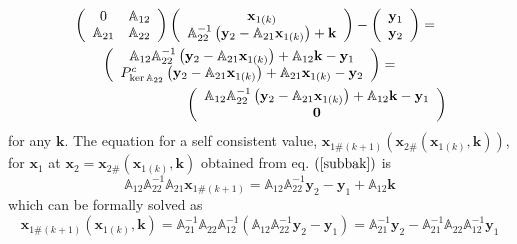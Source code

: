 \documentclass[aps,preprint]{revtex4}%
\begin{document}
\begin{align}
&  \left(
\begin{array}
[c]{cc}%
0 & \mathbb{A}_{12}\\
\mathbb{A}_{21} & \mathbb{A}_{22}%
\end{array}
\right)  \left(
\begin{array}
[c]{c}%
\mathbf{x}_{1\left(  k\right)  }\\
\mathbb{A}_{22}^{-1}\left(  \mathbf{y}_{2}-\mathbb{A}_{21}\mathbf{x}_{1\left(
k\right)  }\right)  +\mathbf{k}%
\end{array}
\right)  -\left(
\begin{array}
[c]{c}%
\mathbf{y}_{1}\\
\mathbf{y}_{2}%
\end{array}
\right)  =\nonumber\\
&  \qquad\left(
\begin{array}
[c]{c}%
\mathbb{A}_{12}\mathbb{A}_{22}^{-1}\left(  \mathbf{y}_{2}-\mathbb{A}%
_{21}\mathbf{x}_{1\left(  k\right)  }\right)  +\mathbb{A}_{12}\mathbf{k}%
-\mathbf{y}_{1}\\
P_{\ker\mathbb{A}_{22}}^{c}\left(  \mathbf{y}_{2}-\mathbb{A}_{21}%
\mathbf{x}_{1\left(  k\right)  }\right)  +\mathbb{A}_{21}\mathbf{x}_{1\left(
k\right)  }-\mathbf{y}_{2}%
\end{array}
\right)  =\nonumber\\
&  \qquad\qquad\qquad\qquad\left(
\begin{array}
[c]{c}%
\mathbb{A}_{12}\mathbb{A}_{22}^{-1}\left(  \mathbf{y}_{2}-\mathbb{A}%
_{21}\mathbf{x}_{1\left(  k\right)  }\right)  +\mathbb{A}_{12}\mathbf{k}%
-\mathbf{y}_{1}\\
\mathbf{0}%
\end{array}
\right)  \label{subbak}%
\end{align}
for any $\mathbf{k}$. The equation for a self consistent value, $\mathbf{x}%
_{1\#\left(  k+1\right)  }\left(  \mathbf{x}_{2\#}\left(  \mathbf{x}_{1\left(
k\right)  },\mathbf{k}\right)  \right)  $, for $\mathbf{x}_{1}$ at
$\mathbf{x}_{2}=\mathbf{x}_{2\#}\left(  \mathbf{x}_{1\left(  k\right)
},\mathbf{k}\right)  $ obtained from eq. $\left(  \ref{subbak}\right)  $ is%
\begin{equation}
\mathbb{A}_{12}\mathbb{A}_{22}^{-1}\mathbb{A}_{21}\mathbf{x}_{1\#\left(
k+1\right)  }=\mathbb{A}_{12}\mathbb{A}_{22}^{-1}\mathbf{y}_{2}-\mathbf{y}%
_{1}+\mathbb{A}_{12}\mathbf{k} \label{scx1}%
\end{equation}
which can be formally solved as
\begin{equation}
\mathbf{x}_{1\#\left(  k+1\right)  }\left(  \mathbf{x}_{1\left(  k\right)
},\mathbf{k}\right)  =\mathbb{A}_{21}^{-1}\mathbb{A}_{22}\mathbb{A}_{12}%
^{-1}\left(  \mathbb{A}_{12}\mathbb{A}_{22}^{-1}\mathbf{y}_{2}-\mathbf{y}%
_{1}\right)  =\mathbb{A}_{21}^{-1}\mathbf{y}_{2}-\mathbb{A}_{21}%
^{-1}\mathbb{A}_{22}\mathbb{A}_{12}^{-1}\mathbf{y}_{1}%
\end{equation}
\end{document}
